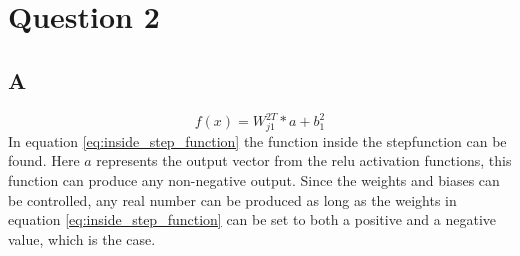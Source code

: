 \section{Question 2}
\subsection*{A}
\begin{equation}
	f(x) = 	W_{j1}^{2T} * a + b_1^2
	\label{eq:inside_step_function}
\end{equation}
In equation \ref{eq:inside_step_function} the function inside the stepfunction can be found. Here $a$ represents the output vector from the relu activation functions, this function can produce any non-negative output. Since the weights and biases can be controlled, any real number can be produced as long as the weights in equation \ref{eq:inside_step_function} can be set to both a positive and a negative value, which is the case. 
